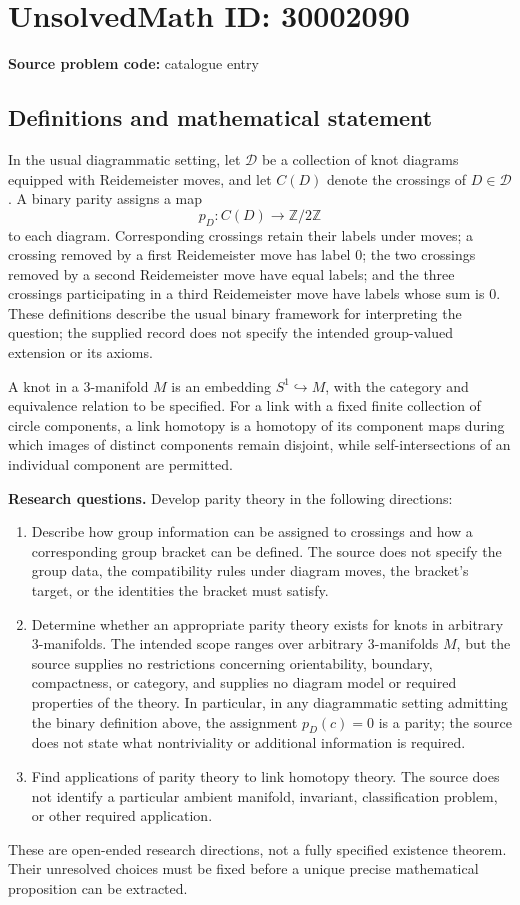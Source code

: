 \documentclass[11pt]{article}
\newcommand{\Z}{\mathbb{Z}}
\begin{document}
\section*{UnsolvedMath ID: 30002090}
\textbf{Source problem code:} catalogue entry
\subsection{Definitions and mathematical statement}
In the usual diagrammatic setting, let \(\mathcal D\) be a collection of knot diagrams equipped with Reidemeister moves, and let \(C(D)\) denote the crossings of \(D\in\mathcal D\). A binary parity assigns a map
\[
p_D:C(D)\longrightarrow \Z/2\Z
\]
to each diagram. Corresponding crossings retain their labels under moves; a crossing removed by a first Reidemeister move has label \(0\); the two crossings removed by a second Reidemeister move have equal labels; and the three crossings participating in a third Reidemeister move have labels whose sum is \(0\). These definitions describe the usual binary framework for interpreting the question; the supplied record does not specify the intended group-valued extension or its axioms.

A knot in a \(3\)-manifold \(M\) is an embedding \(S^1\hookrightarrow M\), with the category and equivalence relation to be specified. For a link with a fixed finite collection of circle components, a link homotopy is a homotopy of its component maps during which images of distinct components remain disjoint, while self-intersections of an individual component are permitted.

\textbf{Research questions.} Develop parity theory in the following directions:
\begin{enumerate}
\item Describe how group information can be assigned to crossings and how a corresponding group bracket can be defined. The source does not specify the group data, the compatibility rules under diagram moves, the bracket's target, or the identities the bracket must satisfy.
\item Determine whether an appropriate parity theory exists for knots in arbitrary \(3\)-manifolds. The intended scope ranges over arbitrary \(3\)-manifolds \(M\), but the source supplies no restrictions concerning orientability, boundary, compactness, or category, and supplies no diagram model or required properties of the theory. In particular, in any diagrammatic setting admitting the binary definition above, the assignment \(p_D(c)=0\) is a parity; the source does not state what nontriviality or additional information is required.
\item Find applications of parity theory to link homotopy theory. The source does not identify a particular ambient manifold, invariant, classification problem, or other required application.
\end{enumerate}
These are open-ended research directions, not a fully specified existence theorem. Their unresolved choices must be fixed before a unique precise mathematical proposition can be extracted.
\end{document}
